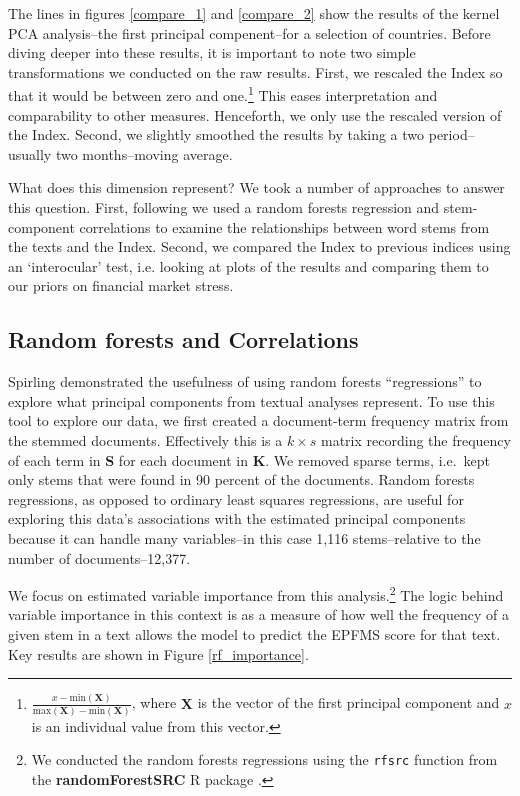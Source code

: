 \documentclass[]{article}
\begin{document}
The lines in figures \ref{compare_1} and \ref{compare_2} show the
results of the kernel PCA analysis--the first principal compenent--for a selection of countries. Before diving deeper into these results, it is important to note two simple transformations we conducted on the raw results. First, we rescaled the Index so that it would be between zero and one.\footnote{\(\frac{x - \mathrm{min}(\bm{X})}{\mathrm{max}(\bm{X}) - \mathrm{min}(\bm{X})}\),
  where \(\bm{X}\) is the vector of the first principal component and
  \(x\) is an individual value from this vector.} This eases
interpretation and comparability to other measures. Henceforth, we only use the rescaled version of the Index. Second, we slightly smoothed the results by taking a two period--usually two months--moving average.

What does this dimension represent? We took a number of approaches to answer this question. First, following \cite{Spirling2012} we used a random forests regression \citep{Breiman2001,jones2015} and stem-component correlations to examine the relationships between word stems from the texts and the Index. Second, we compared the Index to previous indices using an `interocular' test, i.e. looking at plots of the results and comparing them to our priors on financial market stress.

\subsection{Random forests and Correlations}\label{random-forests}

Spirling \citeyearpar[6--8]{Spirling2012} demonstrated the usefulness of using random forests
``regressions'' to explore what principal components from textual analyses represent. To use this tool to explore our data, we first created a document-term
frequency matrix from the stemmed documents. Effectively this is a \(k \times s\) matrix recording the frequency of each term in \(\bm{S}\) for each document in \(\bm{K}\). We removed sparse terms, i.e.~kept only stems that were found in 90 percent of the documents. Random forests regressions, as opposed to ordinary least squares regressions, are useful for exploring this data's associations with the estimated principal components because it can handle many variables--in this case 1,116 stems--relative to the number of documents--12,377.

We focus on estimated variable importance from this analysis.\footnote{We conducted the random forests regressions using the \texttt{rfsrc} function from the \textbf{randomForestSRC} R package \citep{randomForestSRCCite}.} The logic behind variable importance in this context is as a measure of how well the frequency of a given stem in a text allows the model to predict the EPFMS score for that text. Key results are shown in Figure \ref{rf_importance}.
\end{document}
